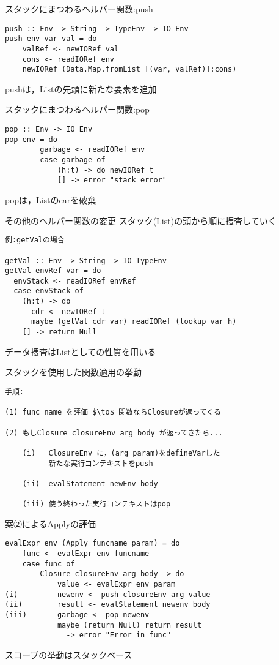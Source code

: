 \documentclass[uplatex,dvipdfmx,ja=standard]{beamer}
\begin{document}
\begin{frame}[fragile]{スタックにまつわるヘルパー関数:push}
    \begin{verbatim}
push :: Env -> String -> TypeEnv -> IO Env 
push env var val = do
    valRef <- newIORef val
    cons <- readIORef env
    newIORef (Data.Map.fromList [(var, valRef)]:cons)
    \end{verbatim}
pushは，Listの先頭に新たな要素を追加
\end{frame}


\begin{frame}[fragile]{スタックにまつわるヘルパー関数:pop}
    \begin{verbatim}
pop :: Env -> IO Env 
pop env = do
        garbage <- readIORef env
        case garbage of
            (h:t) -> do newIORef t
            [] -> error "stack error"
    \end{verbatim}
popは，Listのcarを破棄
\end{frame}

\begin{frame}[fragile]{その他のヘルパー関数の変更}
スタック(List)の頭から順に捜査していく

    \begin{verbatim}
例:getValの場合

getVal :: Env -> String -> IO TypeEnv
getVal envRef var = do
  envStack <- readIORef envRef
  case envStack of
    (h:t) -> do
      cdr <- newIORef t
      maybe (getVal cdr var) readIORef (lookup var h)
    [] -> return Null
    \end{verbatim}
データ捜査はListとしての性質を用いる
\end{frame}

\begin{frame}[fragile]{スタックを使用した関数適用の挙動}
    \begin{verbatim}
手順:

(1) func_name を評価 $\to$ 関数ならClosureが返ってくる 

(2) もしClosure closureEnv arg body が返ってきたら...

    (i)   ClosureEnv に，(arg param)をdefineVarした
          新たな実行コンテキストをpush 

    (ii)  evalStatement newEnv body

    (iii) 使う終わった実行コンテキストはpop
    \end{verbatim}
\end{frame}

\begin{frame}[fragile]{案②によるApplyの評価}
    \begin{verbatim}
evalExpr env (Apply funcname param) = do
    func <- evalExpr env funcname
    case func of
        Closure closureEnv arg body -> do
            value <- evalExpr env param
(i)         newenv <- push closureEnv arg value
(ii)        result <- evalStatement newenv body
(iii)       garbage <- pop newenv
            maybe (return Null) return result
            _ -> error "Error in func"
    \end{verbatim}
スコープの挙動はスタックベース
\end{frame}
\end{document}
